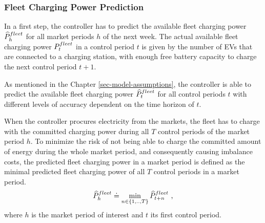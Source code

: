 \documentclass[a4paper, 12pt]{article}
\begin{document}
\subsubsection{Fleet Charging Power Prediction}
\label{sec:org38142b5}
In a first step, the controller has to predict the available fleet charging power
\(\widehat{P}^{fleet}_{h}\) for all market periods \(h\) of the next week.
The actual available fleet charging power \(P^{fleet}_{t}\) in a control period \(t\) is given by the
number of EVs that are connected to a charging station, with enough free battery
capacity to charge the next control period \(t\!+\!1\).

As mentioned in the Chapter \ref{sec-model-assumptions}, the controller is able to
predict the available fleet charging power \(\widehat{P}^{fleet}_{t}\) for all control periods \(t\)
with different levels of accuracy dependent on the time horizon of \(t\).

When the controller procures electricity from the markets, the fleet has to
charge with the committed charging power during all \(T\) control periods of the
market period \(h\).
To minimize the risk of not being able to charge the committed amount of energy
during the whole market period, and consequently causing imbalance costs, the
predicted fleet charging power in a market period is defined as the minimal
predicted fleet charging power of all \(T\) control periods in a market period.
\begin{equation}
    \widehat{P}^{fleet}_{h} \doteq \min_{n \in \{1, .., T\}} \widehat{P}^{fleet}_{t + n} \text{ ,}
\end{equation}
where \(h\) is the market period of interest and \(t\) its first control period.
\end{document}
